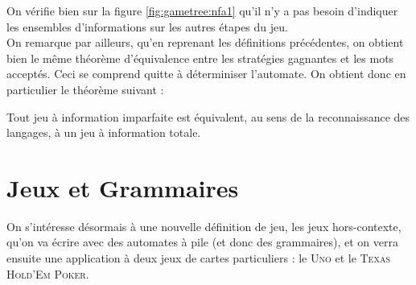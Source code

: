 \documentclass{cours}
\begin{document}
\begin{figure}
    
\end{figure}
On vérifie bien sur la figure \ref{fig:gametree:nfa1} qu'il n'y a pas besoin d'indiquer les ensembles d'informations sur les autres étapes du jeu.\\
On remarque par ailleurs, qu'en reprenant les définitions précédentes, on obtient bien le même théorème d'équivalence entre les stratégies gagnantes et les mots acceptés. Ceci se comprend quitte à déterminiser l'automate. On obtient donc en particulier le théorème suivant : 
\begin{theorem}
    Tout jeu à information imparfaite est équivalent, au sens de la reconnaissance des langages, à un jeu à information totale. 
\end{theorem}

\newpage
\section{Jeux et Grammaires}
On s'intéresse désormais à une nouvelle définition de jeu, les jeux hors-contexte, qu'on va écrire avec des automates à pile (et donc des grammaires), et on verra ensuite une application à deux jeux de cartes particuliers : le \textsc{Uno} et le \textsc{Texas Hold'Em Poker}. 
\end{document}
